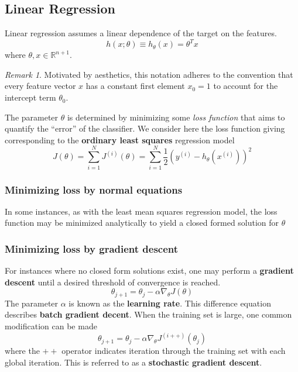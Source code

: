 \documentclass{article}
\theoremstyle{definition}
\theoremstyle{remark}
\newtheorem*{remark}{Remark}
\begin{document}
\subsection{Linear Regression}
Linear regression assumes a linear dependence of the target on the features. 
\begin{equation}
    \label{eqn:linearregression}
    h(x;\theta) \equiv h_{\theta}(x) = \theta^{T}x 
\end{equation}
where $\theta, x \in \mathbb{R}^{n+1}$.
\begin{remark}
Motivated by aesthetics, this notation adheres to the convention that every feature vector $x$ has a constant first element $x_{0}=1$ to account for the intercept term $\theta_{0}$.
\end{remark}
The parameter $\theta$ is determined by minimizing some \textit{loss function} that aims to quantify the ``error'' of the classifier.
We consider here the loss function giving corresponding to the \textbf{ordinary least squares} regression model
\begin{equation}
    \label{eqn:lossfunction}
    J(\theta) = \sum_{i=1}^{N}J^{(i)}(\theta) =  \sum_{i=1}^{N}\frac{1}{2}{\left(y^{(i)} - h_{\theta}(x^{(i)})\right)}^{2}
\end{equation}
\subsubsection{Minimizing loss by normal equations}
In some instances, as with the least mean squares regression model, the loss function may be minimized analytically to yield a closed formed solution for $\theta$


\subsubsection{Minimizing loss by gradient descent}
For instances where no closed form solutions exist, one may perform a \textbf{gradient descent} until a desired threshold of convergence is reached.
\begin{equation}
    \theta_{j+1} = \theta_{j} - \alpha \nabla_{\theta}J(\theta)
\end{equation}
The parameter $\alpha$ is known as the \textbf{learning rate}.
This difference equation describes \textbf{batch gradient decent}.
When the training set is large, one common modification can be made
\begin{equation}
    \theta_{j+1} = \theta_{j} - \alpha \nabla_{\theta} J^{(i++)}(\theta_{j})
\end{equation}
where the $++$ operator indicates iteration through the training set with each global iteration. This is referred to as a \textbf{stochastic gradient descent}.
\end{document}

